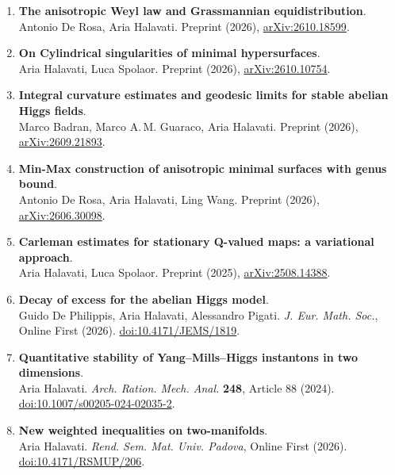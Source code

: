 \documentclass[10pt,letterpaper]{article}
\begin{document}
\begin{enumerate}
  \raggedright
  \item \textbf{The anisotropic Weyl law and Grassmannian equidistribution}. \\
  Antonio De Rosa, Aria Halavati. Preprint (2026), \href{https://arxiv.org/abs/2610.18599}{arXiv:2610.18599}.
  \item \textbf{On Cylindrical singularities of minimal hypersurfaces}. \\
  Aria Halavati, Luca Spolaor. Preprint (2026), \href{https://arxiv.org/abs/2610.10754}{arXiv:2610.10754}.
  \item \textbf{Integral curvature estimates and geodesic limits for stable abelian Higgs fields}. \\
  Marco Badran, Marco A.\,M. Guaraco, Aria Halavati. Preprint (2026), \href{https://arxiv.org/abs/2609.21893}{arXiv:2609.21893}.
  \item \textbf{Min-Max construction of anisotropic minimal surfaces with genus bound}. \\
  Antonio De Rosa, Aria Halavati, Ling Wang. Preprint (2026), \href{https://arxiv.org/abs/2606.30098}{arXiv:2606.30098}.
  \item \textbf{Carleman estimates for stationary Q-valued maps: a variational approach}. \\
  Aria Halavati, Luca Spolaor. Preprint (2025), \href{https://arxiv.org/abs/2508.14388}{arXiv:2508.14388}.
  \item \textbf{Decay of excess for the abelian Higgs model}. \\
  Guido De Philippis, Aria Halavati, Alessandro Pigati. \emph{J. Eur. Math. Soc.}, Online First (2026). \href{https://doi.org/10.4171/JEMS/1819}{doi:10.4171/JEMS/1819}.
  \item \textbf{Quantitative stability of Yang--Mills--Higgs instantons in two dimensions}. \\
  Aria Halavati. \emph{Arch. Ration. Mech. Anal.} \textbf{248}, Article 88 (2024). \href{https://doi.org/10.1007/s00205-024-02035-2}{doi:10.1007/s00205-024-02035-2}.
  \item \textbf{New weighted inequalities on two-manifolds}. \\
  Aria Halavati. \emph{Rend. Sem. Mat. Univ. Padova}, Online First (2026). \href{https://doi.org/10.4171/RSMUP/206}{doi:10.4171/RSMUP/206}.
\end{enumerate}
\end{document}
